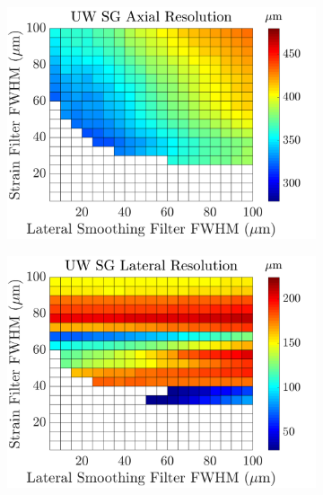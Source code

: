\begin{figure}[b!]
\begin{subfigure}{0.49\textwidth}
		\includegraphics[width=\textwidth]{imageres_figs/uwsg_axial.png}
	\end{subfigure}
	\begin{subfigure}{0.49\textwidth}
		\centering
		\includegraphics[width=\textwidth]{imageres_figs/uwsg_lateral.png}
	\end{subfigure}
	\\
\end{figure}

